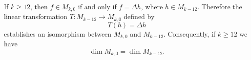 If $k \geq 12$, then $f \in M_{k,0}$ if and only if $f = \Delta h$, where $h \in M_{k-12}$. Therefore the linear transformation $T: M_{k-12} \rightarrow M_{k,0}$ defined by
$$
T(h) = \Delta h
$$
establishes an isomorphism between $M_{k,0}$ and $M_{k-12}$. Consequently, if $k \geq 12$ we have
$$
\dim M_{k,0} = \dim M_{k-12}.
$$

